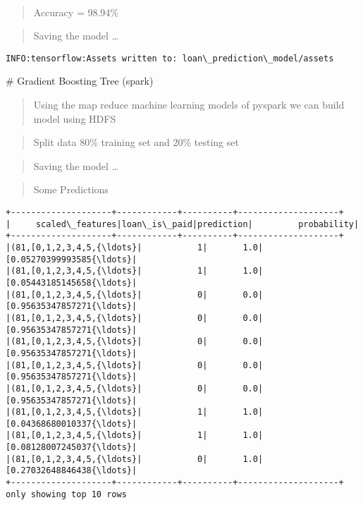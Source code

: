 \documentclass[11pt]{article}
\begin{document}
    \begin{center}
    \end{center}
    { \hspace*{\fill} \\}
    
    \begin{quote}
Accuracy = 98.94\%
\end{quote}

    \begin{quote}
Saving the model \ldots{}
\end{quote}

    \begin{Verbatim}[commandchars=\\\{\}]
INFO:tensorflow:Assets written to: loan\_prediction\_model/assets
    \end{Verbatim}

    \# Gradient Boosting Tree (spark)

    \begin{quote}
Using the map reduce machine learning models of pyspark we can build
model using HDFS
\end{quote}

    \begin{quote}
Split data 80\% training set and 20\% testing set
\end{quote}

    \begin{quote}
Saving the model \ldots{}
\end{quote}

    \begin{quote}
Some Predictions
\end{quote}

    \begin{Verbatim}[commandchars=\\\{\}]
+--------------------+------------+----------+--------------------+
|     scaled\_features|loan\_is\_paid|prediction|         probability|
+--------------------+------------+----------+--------------------+
|(81,[0,1,2,3,4,5,{\ldots}|           1|       1.0|[0.05270399993585{\ldots}|
|(81,[0,1,2,3,4,5,{\ldots}|           1|       1.0|[0.05443185145658{\ldots}|
|(81,[0,1,2,3,4,5,{\ldots}|           0|       0.0|[0.95635347857271{\ldots}|
|(81,[0,1,2,3,4,5,{\ldots}|           0|       0.0|[0.95635347857271{\ldots}|
|(81,[0,1,2,3,4,5,{\ldots}|           0|       0.0|[0.95635347857271{\ldots}|
|(81,[0,1,2,3,4,5,{\ldots}|           0|       0.0|[0.95635347857271{\ldots}|
|(81,[0,1,2,3,4,5,{\ldots}|           0|       0.0|[0.95635347857271{\ldots}|
|(81,[0,1,2,3,4,5,{\ldots}|           1|       1.0|[0.04368680010337{\ldots}|
|(81,[0,1,2,3,4,5,{\ldots}|           1|       1.0|[0.08128007245037{\ldots}|
|(81,[0,1,2,3,4,5,{\ldots}|           0|       1.0|[0.27032648846438{\ldots}|
+--------------------+------------+----------+--------------------+
only showing top 10 rows

    \end{Verbatim}
\end{document}
